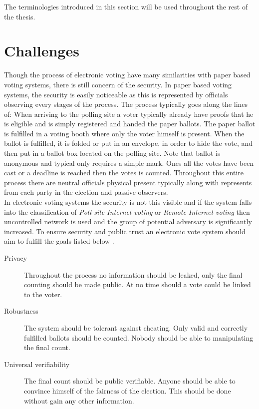 \noindent
The terminologies introduced in this section will be used throughout the rest of the thesis. 

\section{Challenges}
Though the process of electronic voting have many similarities with paper based voting systems, there is still concern of the security. In paper based voting systems, the security is easily noticeable as this is represented by officials observing every stages of the process. The process typically goes along the lines of: When arriving to the polling site a voter typically already have proofs that he is eligible and is simply registered and handed the paper ballots. The paper ballot is fulfilled in a voting booth where only the voter himself is present. When the ballot is fulfilled, it is folded or put in an envelope, in order to hide the vote, and then put in a ballot box located on the polling site. Note that ballot is anonymous and typical only requires a simple mark. Ones all the votes have been cast or a deadline is reached then the votes is counted. Throughout this entire process there are neutral officials physical present typically along with represents from each party in the election and passive observers.   \\

\noindent
In electronic voting systems the security is not this visible and if the system falls into the classification of \textit{Poll-site Internet voting} or \textit{Remote Internet voting} then uncontrolled network is used and the group of potential adversary is significantly increased.
To ensure security and public trust an electronic vote system should aim to fulfill the goals 
listed below \cite{Damgaard2003}.

\begin{description}
    \item[Privacy] Throughout the process no information should be leaked, only the final counting
    should be made public. At no time should a vote could be linked to the voter. 
    
    \item[Robustness] The system should be tolerant against cheating. Only valid and correctly fulfilled ballots should be counted. Nobody should be able to manipulating the final count.

    \item[Universal verifiability] The final count should be public verifiable. Anyone should be able to convince himself of the fairness of the election. This should be done without gain any other information.
        
\end{description}

